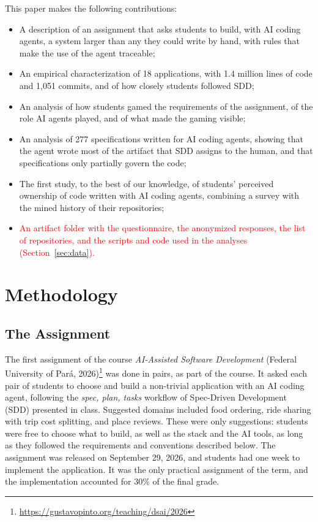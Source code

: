 \documentclass[conference]{IEEEtran}
\begin{document}
This paper makes the following contributions:
\begin{itemize}
\item A description of an assignment that asks students to build, with AI coding agents, a system larger than any they could write by hand, with rules that make the use of the agent traceable;
\item An empirical characterization of 18 applications, with 1.4 million lines of code and 1,051 commits, and of how closely students followed SDD;
\item An analysis of how students gamed the requirements of the assignment, of the role AI agents played, and of what made the gaming visible;
\item An analysis of 277 specifications written for AI coding agents, showing that the agent wrote most of the artifact that SDD assigns to the human, and that specifications only partially govern the code;
\item The first study, to the best of our knowledge, of students' perceived ownership of code written with AI coding agents, combining a survey with the mined history of their repositories;
\item \textcolor{red}{An artifact folder with the questionnaire, the anonymized responses, the list of repositories, and the scripts and code used in the analyses (Section~\ref{sec:data}).}
\end{itemize}

\section{Methodology}

\subsection{The Assignment}

The first assignment of the course \emph{AI-Assisted Software Development} (Federal University of Pará, 2026)\footnote{\url{https://gustavopinto.org/teaching/dsai/2026}} was done in pairs, as part of the course. It asked each pair of students to choose and build a non-trivial application with an AI coding agent, following the \emph{spec, plan, tasks} workflow of Spec-Driven Development (SDD) presented in class. Suggested domains included food ordering, ride sharing with trip cost splitting, and place reviews. These were only suggestions: students were free to choose what to build, as well as the stack and the AI tools, as long as they followed the requirements and conventions described below. The assignment was released on September 29, 2026, and students had one week to implement the application. It was the only practical assignment of the term, and the implementation accounted for 30\% of the final grade.
\end{document}
